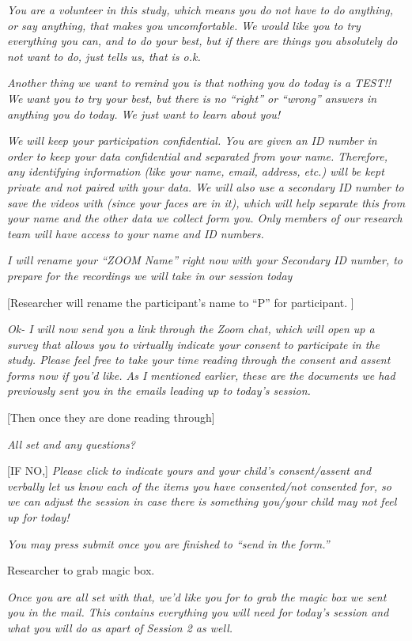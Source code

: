 \documentclass[]{book}
\begin{document}
\emph{You are a volunteer in this study, which means you do not have to do anything, or say anything, that makes you uncomfortable. We would like you to try everything you can, and to do your best, but if there are things you absolutely do not want to do, just tells us, that is o.k.}

\emph{Another thing we want to remind you is that nothing you do today is a TEST!! We want you to try your best, but there is no ``right'' or ``wrong'' answers in anything you do today. We just want to learn about you!}

\emph{We will keep your participation confidential. You are given an ID number in order to keep your data confidential and separated from your name. Therefore, any identifying information (like your name, email, address, etc.) will be kept private and not paired with your data. We will also use a secondary ID number to save the videos with (since your faces are in it), which will help separate this from your name and the other data we collect form you. Only members of our research team will have access to your name and ID numbers.}

\emph{I will rename your ``ZOOM Name'' right now with your Secondary ID number, to prepare for the recordings we will take in our session today}

{[}Researcher will rename the participant's name to ``P'' for participant. {]}

\emph{Ok- I will now send you a link through the Zoom chat, which will open up a survey that allows you to virtually indicate your consent to participate in the study. Please feel free to take your time reading through the consent and assent forms now if you'd like. As I mentioned earlier, these are the documents we had previously sent you in the emails leading up to today's session.}

{[}Then once they are done reading through{]}

\emph{All set and any questions?}

{[}IF NO,{]} \emph{Please click to indicate yours and your child's consent/assent and verbally let us know each of the items you have consented/not consented for, so we can adjust the session in case there is something you/your child may not feel up for today!}

\emph{You may press submit once you are finished to ``send in the form.''}

Researcher to grab magic box.

\emph{Once you are all set with that, we'd like you for to grab the magic box we sent you in the mail. This contains everything you will need for today's session and what you will do as apart of Session 2 as well.}
\end{document}
